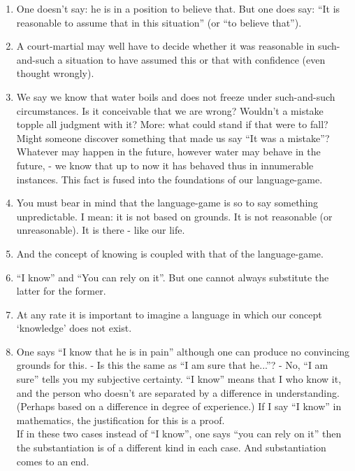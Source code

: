 \documentclass{book}
\begin{document}
\begin{enumerate}
\item
One doesn't say: he is in a position to believe that.  But one does say: ``It
is reasonable to assume that in this situation'' (or ``to believe that'').

\item
A court-martial may well have to decide whether it was reasonable in
such-and-such a situation to have assumed this or that with confidence (even
thought wrongly).

\item
We say we know that water boils and does not freeze under such-and-such
circumstances. Is it conceivable that we are wrong? Wouldn't a mistake topple
all judgment with it? More: what could stand if that were to fall? Might
someone discover something that made us say ``It was a mistake''?  Whatever may
happen in the future, however water may behave in the future, - we know that up
to now it has behaved thus in innumerable instances.  This fact is fused into
the foundations of our language-game.

\item
You must bear in mind that the language-game is so to say something
unpredictable. I mean: it is not based on grounds. It is not reasonable (or
unreasonable).  It is there - like our life.

\item
And the concept of knowing is coupled with that of the language-game.

\item
``I know'' and ``You can rely on it''. But one cannot always substitute the
latter for the former.

\item
At any rate it is important to imagine a language in which our concept
`knowledge' does not exist.

\item
One says ``I know that he is in pain'' although one can produce no convincing
grounds for this. - Is this the same as ``I am sure that he...''? - No, ``I am
sure'' tells you my subjective certainty. ``I know'' means that I who know it,
and the person who doesn't are separated by a difference in understanding.
(Perhaps based on a difference in degree of experience.) If I say ``I know'' in
mathematics, the justification for this is a proof.
\\
If in these two cases instead of ``I know'', one says ``you can rely on it'' then the
substantiation is of a different kind in each case.  And substantiation comes
to an end.


\end{enumerate}
\end{document}
